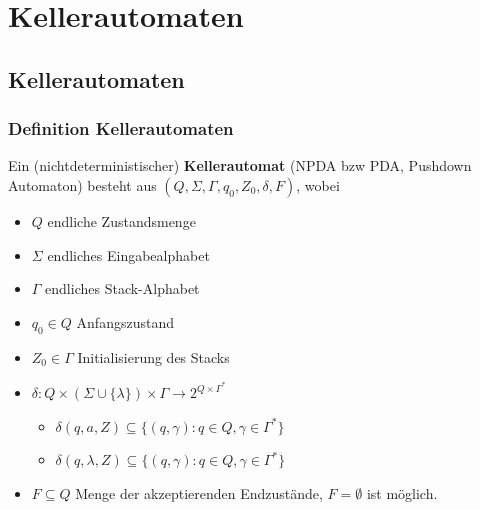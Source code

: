 \section{Kellerautomaten}
\subsection{Kellerautomaten}
\begin{frame}
	\frametitle{Definition Kellerautomaten}
	Ein (nichtdeterministischer) \textbf{Kellerautomat} (NPDA bzw PDA, Pushdown Automaton) besteht aus $(Q, \Sigma, \Gamma, q_0, Z_0,\delta, F)$, wobei
	\begin{itemize}
		\item $Q$ endliche Zustandsmenge
		\item $\Sigma$ endliches Eingabealphabet
		\item $\Gamma$ endliches Stack-Alphabet
		\item $q_0 \in Q$ Anfangszustand
		\item $Z_0 \in \Gamma$ Initialisierung des Stacks
		\item $\delta : Q \times ( \Sigma \cup \{\lambda\}) \times \Gamma \rightarrow 2^{Q \times \Gamma^*}$
		\begin{itemize}
			\item $\delta(q, a, Z) \subseteq \{(q,\gamma) : q \in Q, \gamma \in \Gamma^*\}$
			\item $\delta(q, \lambda, Z) \subseteq \{(q,\gamma) : q \in Q, \gamma \in \Gamma^*\}$
		\end{itemize}
		\item $F \subseteq Q$ Menge der akzeptierenden Endzustände, $F=\emptyset$ ist möglich.
		
		\vspace{-4cm}
	\end{itemize}
\end{frame}

